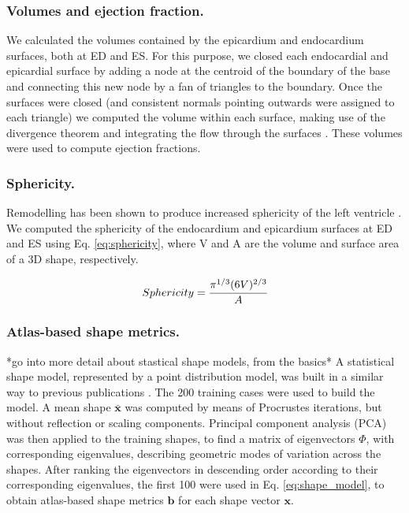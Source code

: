 \documentclass[journal]{IEEEtran}
\begin{document}
	\subsubsection{Volumes and ejection fraction.}
We calculated the volumes contained by the epicardium and endocardium surfaces, both at ED and ES. For this purpose, we closed each endocardial and epicardial surface by adding a node at the centroid of the boundary of the base and connecting this new node by a fan of triangles to the boundary. Once the surfaces were closed (and consistent normals pointing outwards were assigned to each triangle) we computed the volume within each surface, making use of the divergence theorem and integrating the flow through the surfaces \cite{Millan2007}. These volumes were used to compute ejection fractions. 
\subsubsection{Sphericity.}Remodelling has been shown to produce increased sphericity of the left ventricle \cite{Sutton2000}. We  computed the sphericity \cite{Wadell1933} of the endocardium and epicardium surfaces at ED and ES using Eq. \ref{eq:sphericity}, where V and A are the volume and surface area of a 3D shape, respectively.

\begin{equation} \label{eq:sphericity}
 Sphericity = \cfrac{\pi^{1/3}(6V)^{2/3}}{A} 
\end{equation}

\subsubsection{Atlas-based shape metrics.} 
*go into more detail about stastical shape models, from the basics*
A statistical shape model, represented by a point distribution model, was built in a similar way to previous publications \cite{VanAssen2006,Lotjonen2004}. The 200 training cases were used to build the model. A mean shape $\mathbf{\bar{x}}$ was computed by means of Procrustes iterations, but without reflection or scaling components. Principal component analysis (PCA) was then applied to the training shapes, to find a matrix of eigenvectors $\Phi$, with corresponding eigenvalues, describing geometric modes of variation across the shapes. 
After ranking the eigenvectors in descending order according to their corresponding eigenvalues, the first 100 were used in Eq. \ref{eq:shape_model}, to obtain atlas-based shape metrics $\textbf{b} $ for each shape vector $ \textbf{x} $. 
\end{document}
